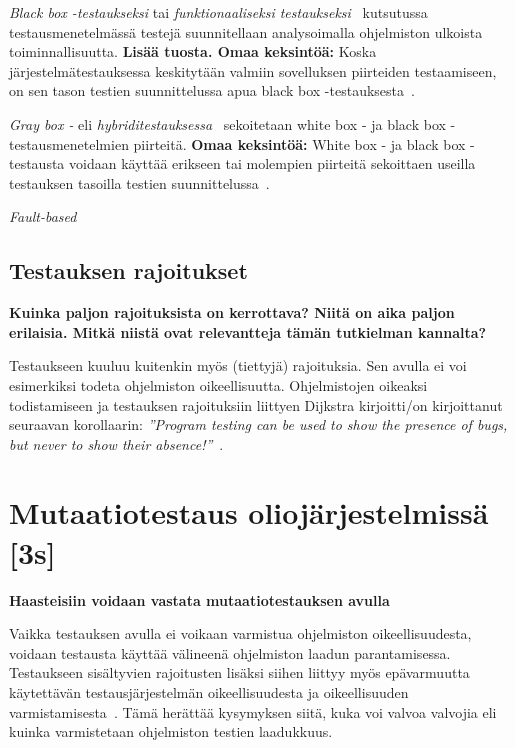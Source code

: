 \documentclass[finnish, grading]{tktltiki2}
\theoremstyle{definition}
\theoremstyle{remark}
\begin{document}
\textit{Black box -testaukseksi} tai \textit{funktionaaliseksi testaukseksi}~\cite[s. 52]{Binder:1999} kutsutussa testausmenetelmässä testejä suunnitellaan analysoimalla ohjelmiston ulkoista toiminnallisuutta. \textbf{Lisää tuosta. Omaa keksintöä:} Koska järjestelmätestauksessa keskitytään valmiin sovelluksen piirteiden testaamiseen, on sen tason testien suunnittelussa apua black box -testauksesta~\cite{Mistä lie?}.

\textit{Gray box -} eli \textit{hybriditestauksessa}~\cite[s. 52]{Binder:1999} sekoitetaan white box - ja black box -testausmenetelmien piirteitä. \textbf{Omaa keksintöä:} White box - ja black box -testausta voidaan käyttää erikseen tai molempien piirteitä sekoittaen useilla testauksen tasoilla testien suunnittelussa~\cite{Mistä lie tähän?}.

\textit{Fault-based}


\subsection{Testauksen rajoitukset}

\textbf{Kuinka paljon rajoituksista on kerrottava? Niitä on aika paljon erilaisia. Mitkä niistä ovat relevantteja tämän tutkielman kannalta?}

Testaukseen kuuluu kuitenkin myös (tiettyjä) rajoituksia. Sen avulla ei voi esimerkiksi todeta ohjelmiston oikeellisuutta. Ohjelmistojen oikeaksi todistamiseen ja testauksen rajoituksiin liittyen Dijkstra kirjoitti/on kirjoittanut seuraavan korollaarin: \textit{''Program testing can be used to show the presence of bugs, but never to show their absence!''}~\cite[s. 6]{Dahl:Dijkstra:Hoare:1972}. 

\section{Mutaatiotestaus oliojärjestelmissä [3s]}

\textbf{Haasteisiin voidaan vastata mutaatiotestauksen avulla}

Vaikka testauksen avulla ei voikaan varmistua ohjelmiston oikeellisuudesta, voidaan testausta käyttää välineenä ohjelmiston laadun parantamisessa. Testaukseen sisältyvien rajoitusten lisäksi siihen liittyy myös epävarmuutta käytettävän testausjärjestelmän oikeellisuudesta ja oikeellisuuden varmistamisesta~\cite[s. 209]{Manna:Waldinger:1978}. Tämä herättää kysymyksen siitä, kuka voi valvoa valvojia eli kuinka varmistetaan ohjelmiston testien laadukkuus.
\end{document}
